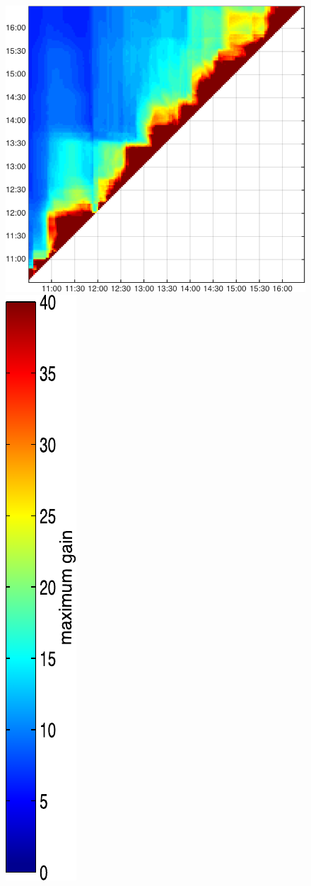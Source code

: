 \begin{figure}
\begin{minipage}[c]{\mylength}
\includegraphics[valign=t,width=\eventswidth]{events/20141108-maxGain-local-events.png}
\includegraphics[valign=t,trim=2pt -8pt 0 5pt,width=\colorbarwidth,totalheight=\eventheight]{events/colorbar-40.pdf}

\end{minipage}
\end{figure}
